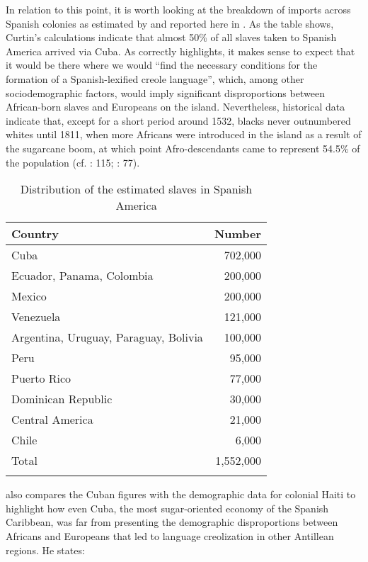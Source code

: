 \documentclass[output=paper,colorlinks,citecolor=brown]{langscibook}
\begin{document}
In relation to this point, it is worth looking at the breakdown of imports across Spanish colonies as estimated by \citet[89]{Curtin1969} and reported here in . As the table shows, Curtin’s calculations indicate that almost 50\% of all slaves taken to Spanish America arrived via Cuba. As \citep[70]{Clements2009} correctly highlights, it makes sense to expect that it would be there where we would “find the necessary conditions for the formation of a Spanish-lexified creole language”, which, among other sociodemographic factors, would imply significant disproportions between African-born slaves and Europeans on the island. Nevertheless, historical data indicate that, except for a short period around 1532, blacks never outnumbered whites until 1811, when more Africans were introduced in the island as a result of the sugarcane boom, at which point Afro-descendants came to represent 54.5\% of the population (cf. \citealt{Masó1976}: 115; \citealt{Clements2009}: 77).

\begin{table}
\begin{tabular}{lr}
\lsptoprule
 {Country} & {Number}\\
 \midrule
 Cuba & 702,000\\
 Ecuador, Panama, Colombia & 200,000\\
 Mexico & 200,000\\
 Venezuela & 121,000\\
 Argentina, Uruguay, Paraguay, Bolivia & 100,000\\
 Peru & 95,000\\
 Puerto Rico & 77,000\\
 Dominican Republic & 30,000\\
 Central America & 21,000\\
 Chile & 6,000\\
 \midrule
 Total & 1,552,000\\
\lspbottomrule
\end{tabular}
\caption{Distribution of the estimated slaves in Spanish America\label{tab:visconti:2}}
\end{table}

\citet[78--79]{Clements2009} also compares the Cuban figures with the demographic data for colonial Haiti to highlight how even Cuba, the most sugar-oriented economy of the Spanish Caribbean, was far from presenting the demographic disproportions between Africans and Europeans that led to language creolization in other Antillean regions. He states:
\end{document}
